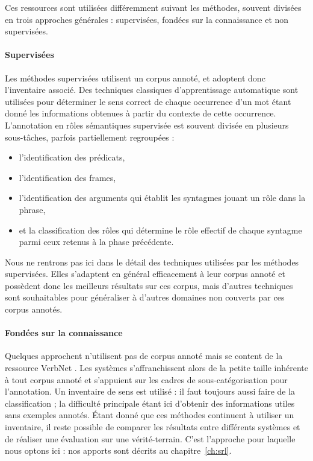 Ces ressources sont utilisées différemment suivant les méthodes, souvent
divisées en trois approches générales : supervisées, fondées sur la
connaissance et non supervisées.

\paragraph{Supervisées}


Les méthodes supervisées
\citep{gildea2002automatic,surdeanu2008conll,das2014frame,hermann2014semantic,lluis2014shortest}
utilisent un corpus annoté, et adoptent donc l'inventaire associé. Des
techniques classiques d'apprentissage automatique sont utilisées pour
déterminer le sens correct de chaque occurrence d'un mot étant donné les
informations obtenues à partir du contexte de cette occurrence.  L'annotation
en rôles sémantiques supervisée est souvent divisée en plusieurs sous-tâches,
parfois partiellement regroupées :

\begin{itemize}
    \item l'identification des prédicats,
    \item l'identification des frames,
    \item l'identification des arguments qui établit les syntagmes jouant un rôle dans la phrase,
    \item et la classification des rôles qui détermine le rôle effectif de
chaque syntagme parmi ceux retenus à la phase précédente.
\end{itemize}

Nous ne rentrons pas ici dans le détail des techniques utilisées par les
méthodes supervisées. Elles s'adaptent en général efficacement à leur corpus
annoté et possèdent donc les meilleurs résultats sur ces corpus, mais d'autres
techniques sont souhaitables pour généraliser à d'autres domaines non couverts
par ces corpus annotés.


\paragraph{Fondées sur la connaissance}

Quelques approchent n'utilisent pas de corpus annoté mais se content de la
ressource VerbNet
\citep{swier2004unsupervised,swier2005exploiting,pradet2013revisiting}. Les
systèmes s'affranchissent alors de la petite taille inhérente à tout corpus
annoté et s'appuient sur les cadres de sous-catégorisation pour l'annotation.
Un inventaire de sens est utilisé : il faut toujours aussi faire de la
classification ; la difficulté principale étant ici d'obtenir des informations
utiles sans exemples annotés. Étant donné que ces méthodes continuent à
utiliser un inventaire, il reste possible de comparer les résultats entre
différents systèmes et de réaliser une évaluation sur une vérité-terrain. C'est
l'approche pour laquelle nous optons ici : nos apports sont décrits au
chapitre~\ref{ch:srl}.

